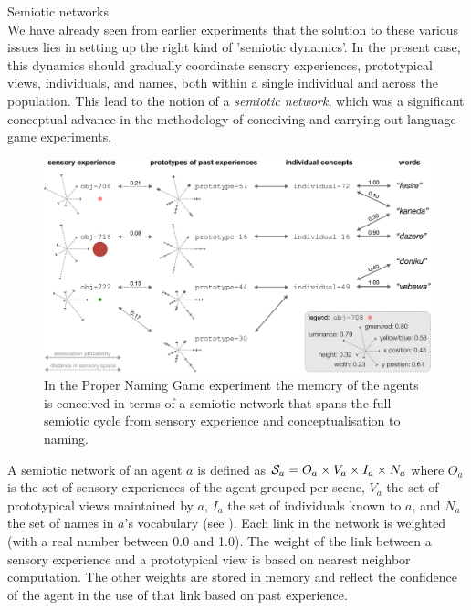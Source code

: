 {\bfshape Semiotic networks}\\

We have already seen from earlier experiments that the solution to these various issues lies in setting up
the right kind of 'semiotic dynamics'. In the present case, this dynamics should gradually coordinate
sensory experiences, prototypical views, individuals, 
and names, both within a single individual and across the
population. This lead to the notion of a {\itshape semiotic network}, which was a significant conceptual advance 
in the methodology of conceiving and carrying out language game experiments.


\begin{figure}[htbp]
  \centerline{\includegraphics[width=.95\textwidth]{chap10/figs/prototypes-identifiers-words}}
\caption{\label{fig:prototypes-identifiers-words} 
In the Proper Naming Game experiment the memory of the agents is conceived in terms of a semiotic network that 
spans the full semiotic cycle from sensory experience and conceptualisation to naming.}
\end{figure}

A semiotic network of an agent $a$ is defined as 
${\cal S}_a = O_a \times V_a \times I_a \times N_a$ where $O_a$ is the set of
sensory experiences of the agent grouped per scene, $V_a$ the set of
prototypical views maintained by $a$, $I_a$ the set of individuals
 known to $a$, and $N_a$ the set of names in $a$'s vocabulary
(see 
). Each link in the network is weighted (with a real number between 0.0 and 1.0). The
weight of the link between a sensory experience and a prototypical
view is based on nearest neighbor computation. The other weights are
stored in memory and reflect the confidence of the agent in the use of
that link based on past experience. 

